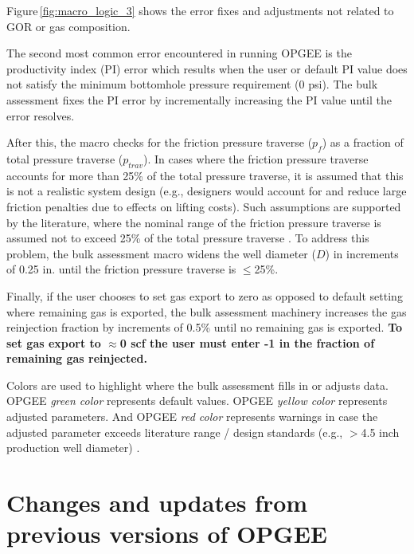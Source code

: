 \documentclass[11pt]{report}
\begin{document}
{{{{Figure\,\ref{fig:macro_logic_3} shows the error fixes and adjustments not related to GOR or gas composition. 

The second most common error encountered in running OPGEE is the productivity index (PI) error which results when the user or default PI value does not satisfy the minimum bottomhole pressure requirement (0 psi). The bulk assessment fixes the PI error by incrementally increasing the PI value until the error resolves. 

After this, the macro checks for the friction pressure traverse ($p_f$) as a fraction of total pressure traverse ($p_{trav}$). In cases where the friction pressure traverse accounts for more than 25\% of the total pressure traverse, it is assumed that this is not a realistic system design (e.g., designers would account for and reduce large friction penalties due to effects on lifting costs). Such assumptions are supported by the literature, where the nominal range of the friction pressure traverse is assumed not to exceed 25\% of the total pressure traverse \cite{Takacs2005}. To address this problem, the bulk assessment macro widens the well diameter ($D$) in increments of 0.25 in. until the friction pressure traverse is $\leq$25\%. 

Finally, if the user chooses to set gas export to zero as opposed to default setting where remaining gas is exported, the bulk assessment machinery increases the gas reinjection fraction by increments of 0.5\% until no remaining gas is exported. \textbf{To set gas export to $\approx$0 scf the user must enter -1 in the fraction of remaining gas reinjected.} \par

Colors are used to highlight where the bulk assessment fills in or adjusts data. OPGEE \textit{green color} represents default values. OPGEE \textit{yellow color} represents adjusted parameters. And OPGEE \textit{red color} represents warnings in case the adjusted parameter exceeds literature range / design standards (e.g., $>$4.5 inch production well diameter) \cite[p. 106]{Clegg2007}.





\chapter{Changes and updates from previous versions of OPGEE}




}}}}
\end{document}
